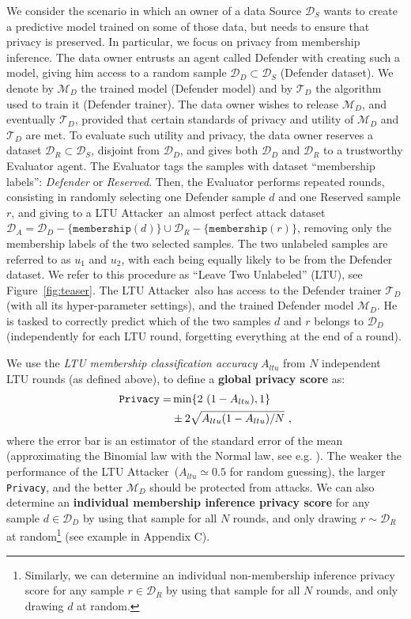 \documentclass[letterpaper]{article}
\newcommand{\sminus}{-}
\newcommand{\oracle}{LTU Attacker~}
\begin{document}
We consider the scenario in which an owner of a data Source $\mathcal{D}_S$
wants to create a predictive model trained on some of those data, but needs to ensure that privacy is preserved. In particular, we focus on privacy from membership inference.
The data owner entrusts an agent called Defender with creating such a model, giving him access to a random sample $\mathcal{D}_D \subset \mathcal{D}_S$ (Defender dataset).
We denote by  $\mathcal{M}_D$ the trained model (Defender model) and by $\mathcal{T}_D$ the algorithm used to train it (Defender trainer).
The data owner wishes to release $\mathcal{M}_D$, and eventually $\mathcal{T}_D$, provided that certain standards of privacy and utility of $\mathcal{M}_D$ and $\mathcal{T}_D$ are met.
To evaluate such utility and privacy, the data owner reserves a dataset $\mathcal{D}_R \subset \mathcal{D}_S$, disjoint from $\mathcal{D}_D$, and gives both $\mathcal{D}_D$ and $\mathcal{D}_R$ to a trustworthy Evaluator agent.
The Evaluator tags the samples with dataset ``membership labels'': {\em Defender} or {\em Reserved}.
Then, the Evaluator performs repeated rounds, consisting in randomly selecting one Defender sample $d$ and one Reserved sample $r$,
and giving to a \oracle an almost perfect attack dataset $\mathcal{D}_A=\mathcal{D}_D\sminus\{\texttt{membership}(d)\} \cup \mathcal{D}_R\sminus\{\texttt{membership}(r)\}$, removing only the membership labels of the two selected samples. The two unlabeled samples are referred to as $u_1$ and $u_2$, with each being equally likely to be from the Defender dataset.
We refer to this procedure as  ``Leave Two Unlabeled'' (LTU), see Figure~\ref{fig:teaser}. The \oracle also has access to the Defender trainer $\mathcal{T}_D$ (with all its hyper-parameter settings), and the trained Defender model $\mathcal{M}_D$. He is tasked to correctly predict which of the two samples $d$ and $r$ belongs to $\mathcal{D}_D$ (independently for each LTU round, forgetting everything at the end of a round).

We use the {\em LTU membership classification accuracy} $A_{ltu}$ from $N$ independent LTU rounds (as defined above), to define a {\bf global privacy score} as:
\begin{align}\label{equation:privacy}
\texttt{Privacy} = &\min\{2~(1 - A_{ltu}), 1\} \notag \\
                   &\pm 2 \sqrt{A_{ltu}(1-A_{ltu})/N} ~,
\end{align}
where the error bar is an estimator of the standard error of the mean (approximating the Binomial law with the Normal law, see e.g. \cite{guyon-1998}).
The weaker the performance of the \oracle ($A_{ltu} \simeq 0.5$ for random guessing), the larger \texttt{Privacy}, and the better $\mathcal{M}_D$ should be protected from attacks.
We can also determine an {\bf individual membership inference privacy score} for any sample $d \in \mathcal{D}_{D}$ by using that sample for all $N$ rounds, and only drawing $r\sim \mathcal{D}_{R}$ at random\footnote{Similarly, we can determine an individual non-membership inference privacy score for any sample $r \in \mathcal{D}_{R}$ by using that sample for all $N$ rounds, and only drawing $d$ at random.} (see example in Appendix C).
\end{document}
